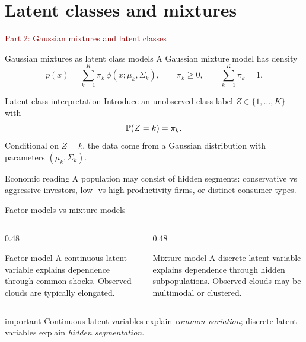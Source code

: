 \documentclass[dvipsnames,aspectratio=169,handout]{beamer}
\begin{document}

\section{Latent classes and mixtures}

\begin{frame}{}
\begin{center}
{\Huge \textcolor{DarkRed}{Part 2: Gaussian mixtures and latent classes}}
\end{center}
\end{frame}

\begin{frame}{Gaussian mixtures as latent class models}
A Gaussian mixture model has density
\[
p(x)=\sum_{k=1}^K \pi_k \, \phi(x;\mu_k,\Sigma_k),
\qquad
\pi_k\ge 0,
\qquad
\sum_{k=1}^K \pi_k=1.
\]

\begin{block}{Latent class interpretation}
Introduce an unobserved class label $Z\in\{1,\ldots,K\}$ with
\[
\P(Z=k)=\pi_k.
\]
Conditional on $Z=k$, the data come from a Gaussian distribution with parameters $(\mu_k,\Sigma_k)$.
\end{block}

\begin{alertblock}{Economic reading}
A population may consist of hidden segments: conservative vs aggressive investors, low- vs high-productivity firms, or distinct consumer types.
\end{alertblock}
\end{frame}

\begin{frame}{Factor models vs mixture models}
\begin{columns}[T]
\begin{column}{0.48\textwidth}
\begin{block}{Factor model}
A continuous latent variable explains dependence through common shocks.
Observed clouds are typically elongated.
\end{block}
\end{column}
\begin{column}{0.48\textwidth}
\begin{block}{Mixture model}
A discrete latent variable explains dependence through hidden subpopulations.
Observed clouds may be multimodal or clustered.
\end{block}
\end{column}
\end{columns}

\begin{beamercolorbox}[wd=\textwidth,sep=7pt,center,rounded=true,shadow=true]{important}
Continuous latent variables explain \emph{common variation};
 discrete latent variables explain \emph{hidden segmentation}.
\end{beamercolorbox}
\end{frame}
\end{document}
